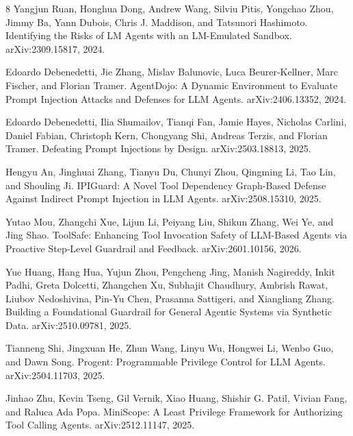 \documentclass[10pt,twocolumn]{article}
\begin{document}
\begin{thebibliography}{8}
Yangjun Ruan, Honghua Dong, Andrew Wang, Silviu Pitis, Yongchao Zhou, Jimmy Ba, Yann Dubois, Chris J. Maddison, and Tatsunori Hashimoto.
\newblock Identifying the Risks of LM Agents with an LM-Emulated Sandbox.
\newblock arXiv:2309.15817, 2024.

Edoardo Debenedetti, Jie Zhang, Mislav Balunovic, Luca Beurer-Kellner, Marc Fischer, and Florian Tramer.
\newblock AgentDojo: A Dynamic Environment to Evaluate Prompt Injection Attacks and Defenses for LLM Agents.
\newblock arXiv:2406.13352, 2024.

Edoardo Debenedetti, Ilia Shumailov, Tianqi Fan, Jamie Hayes, Nicholas Carlini, Daniel Fabian, Christoph Kern, Chongyang Shi, Andreas Terzis, and Florian Tramer.
\newblock Defeating Prompt Injections by Design.
\newblock arXiv:2503.18813, 2025.

Hengyu An, Jinghuai Zhang, Tianyu Du, Chunyi Zhou, Qingming Li, Tao Lin, and Shouling Ji.
\newblock IPIGuard: A Novel Tool Dependency Graph-Based Defense Against Indirect Prompt Injection in LLM Agents.
\newblock arXiv:2508.15310, 2025.

Yutao Mou, Zhangchi Xue, Lijun Li, Peiyang Liu, Shikun Zhang, Wei Ye, and Jing Shao.
\newblock ToolSafe: Enhancing Tool Invocation Safety of LLM-Based Agents via Proactive Step-Level Guardrail and Feedback.
\newblock arXiv:2601.10156, 2026.

Yue Huang, Hang Hua, Yujun Zhou, Pengcheng Jing, Manish Nagireddy, Inkit Padhi, Greta Dolcetti, Zhangchen Xu, Subhajit Chaudhury, Ambrish Rawat, Liubov Nedoshivina, Pin-Yu Chen, Prasanna Sattigeri, and Xiangliang Zhang.
\newblock Building a Foundational Guardrail for General Agentic Systems via Synthetic Data.
\newblock arXiv:2510.09781, 2025.

Tianneng Shi, Jingxuan He, Zhun Wang, Linyu Wu, Hongwei Li, Wenbo Guo, and Dawn Song.
\newblock Progent: Programmable Privilege Control for LLM Agents.
\newblock arXiv:2504.11703, 2025.

Jinhao Zhu, Kevin Tseng, Gil Vernik, Xiao Huang, Shishir G. Patil, Vivian Fang, and Raluca Ada Popa.
\newblock MiniScope: A Least Privilege Framework for Authorizing Tool Calling Agents.
\newblock arXiv:2512.11147, 2025.
\end{thebibliography}
\end{document}
